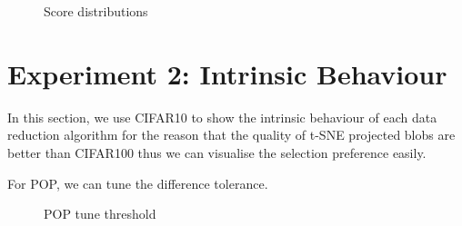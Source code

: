 \begin{figure}[H]
\centering  
{}
\caption{Score distributions}
\label{Fig.clscores}
\end{figure}





\section{Experiment 2: Intrinsic Behaviour}
In this section, we use CIFAR10 to show the intrinsic behaviour of each data reduction algorithm for the reason that the quality of t-SNE projected blobs are better than CIFAR100 thus we can visualise the selection preference easily. 

For POP, we can tune the difference tolerance.   
\begin{figure}[H]
\centering  
{}
\caption{POP tune threshold}
\label{Fig.popcifar10}
\end{figure}

